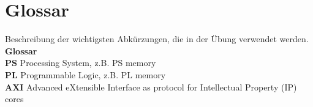 
\section{Glossar}
Beschreibung der wichtigsten Abkürzungen, die in der Übung verwendet werden.\\

\textbf{Glossar}\\
\textbf{PS}	Processing System, z.B. PS memory \\
\textbf{PL} Programmable Logic, z.B. PL memory\\
\textbf{AXI} Advanced eXtensible Interface as protocol for Intellectual Property (IP) cores\\
